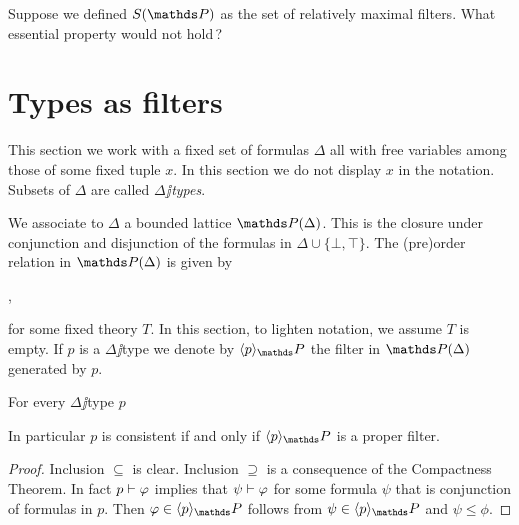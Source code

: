 \documentclass[creche.tex]{subfiles}
\begin{document}
\begin{exercise}
Suppose we defined $S(\PP)$ as the set of relatively maximal filters. What essential property would not hold\,?\QED
\end{exercise}
\section{Types as filters}\label{frammenti}

This section we work with a fixed set of formulas \emph{$\Delta$\/} all with free variables among those of some fixed tuple \emph{$x$}. In this section we do not display $x$ in the notation. Subsets of $\Delta$ are called \emph{$\Delta\jj$types}.

We associate to $\Delta$ a bounded lattice \emph{$\PP(\Delta)$}. This is the closure under conjunction and disjunction of the formulas in $\Delta\cup\{\bot,\top\}$. The (pre)order relation in $\PP(\Delta)$ is given by

,

for some fixed theory $T$. In this section, to lighten notation, we assume $T$ is empty. If $p$ is a $\Delta\jj$type we denote by $\<p\>_\PP$ the filter in $\PP(\Delta)$ generated by $p$.




\begin{lemma}\label{lem_poiuyhdsdfd}
For every $\Delta\jj$type $p$


In particular $p$ is consistent if and only if $\<p\>_\PP$ is a proper filter.
\end{lemma}



\begin{proof}
Inclusion $\subseteq$ is clear. Inclusion $\supseteq$ is a consequence of the Compactness Theorem. In fact $p\vdash\varphi$ implies that $\psi\vdash\varphi$ for some formula $\psi$ that is conjunction of formulas in $p$. Then $\phi\in\<p\>_\PP$ follows from $\psi\in\<p\>_\PP$ and $\psi\le\phi$.
\end{proof}
\end{document}
